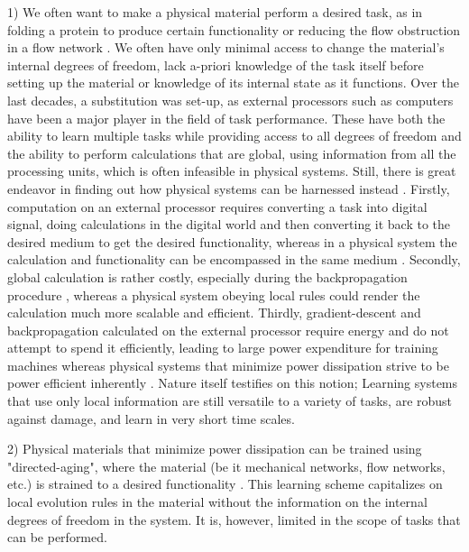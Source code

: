 \documentclass[%
 reprint,
 amsmath,amssymb,
 aps,
]{revtex4-2}
\begin{document}
    1) We often want to make a physical material perform a desired task, as in folding a protein to produce certain functionality  or reducing the flow obstruction in a flow network . We often have only minimal access to change the material's internal degrees of freedom, lack a-priori knowledge of the task itself before setting up the material or knowledge of its internal state as it functions. 
    Over the last decades, a substitution was set-up, as external processors such as computers have been a major player in the field of task performance. These have both the ability to learn multiple tasks while providing access to all degrees of freedom and the ability to perform calculations that are global, using information from all the processing units, which is often infeasible in physical systems. 
    Still, there is great endeavor in finding out how physical systems can be harnessed instead \cite{lopez2023self}. 
    Firstly, computation on an external processor requires converting a task into digital signal, doing calculations in the digital world and then converting it back to the desired medium to get the desired functionality, whereas in a physical system the calculation and functionality can be encompassed in the same medium \cite{stern2023learning}. 
    Secondly, global calculation is rather costly, especially during the backpropagation procedure \cite{xie2003equivalence}, whereas  a physical system obeying local rules could render the calculation much more scalable and efficient.
    Thirdly, gradient-descent and backpropagation calculated on the external processor require energy and do not attempt to spend it efficiently, leading to large power expenditure for training machines \cite{luccioni2023estimating, mytton2022sources} whereas physical systems that minimize power dissipation strive to be power efficient inherently \cite{berneman2024designing}.
    Nature itself testifies on this notion; Learning systems that use only local information are still versatile to a variety of tasks, \textcolor{roie}{are robust against damage, and learn in very short time scales.}

    2) Physical materials that minimize power dissipation can be trained using "directed-aging", where the material (be it mechanical networks, flow networks, etc.) is strained to a desired functionality \cite{pashine2019directed, hexner2020effect}. This learning scheme capitalizes on local evolution rules in the material without the information on the internal degrees of freedom in the system. It is, however, limited in the scope of tasks that can be performed.
\end{document}

